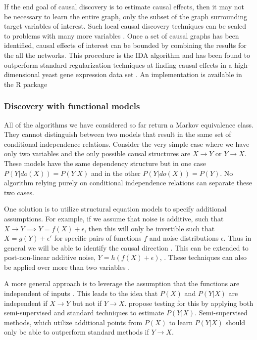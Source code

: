 \documentclass[11pt,a4paper]{article}
\begin{document}
If the end goal of causal discovery is to estimate causal effects, then it may not be necessary to learn the entire graph, only the subset of the graph surrounding target variables of interest. Such local causal discovery techniques can be scaled to problems with many more variables \cite{Aliferis2002}. Once a set of causal graphs has been identified, causal effects of interest can be bounded by combining the results for the all the networks. This procedure is the IDA algorithm \cite{Maathuis2009} and has been found to outperform standard regularization techniques at finding causal effects in a high-dimensional yeast gene expression data set \cite{Maathuis2010}. An implementation is available in the R package \cite{Kalisch2012}

\subsubsection{Discovery with functional models}
All of the algorithms we have considered so far return a Markov equivalence class. They cannot distinguish between two models that result in the same set of conditional independence relations. Consider the very simple case where we have only two variables and the only possible causal structures are $X \rightarrow Y$ or $Y \rightarrow X$. These models have the same dependency structure but in one case $P(Y|do(X)) = P(Y|X)$ and in the other $P(Y|do(X)) = P(Y)$. No algorithm relying purely on conditional independence relations can separate these two cases.

One solution is to utilize structural equation models to specify additional assumptions. For example, if we assume that noise is additive, such that $X \rightarrow Y \implies Y = f(X)+\epsilon$, then this will only be invertible such that $X = g(Y) + \epsilon'$ for specific pairs of functions $f$ and noise distributions $\epsilon$. Thus in general we will be able to identify the causal direction \cite{Hoyer2009}. This can be extended to post-non-linear additive noise, $Y = h(f(X)+ \epsilon)$, \cite{Zhang2008a}. These techniques can also be applied over more than two variables \cite{Peters2014}.

A more general approach is to leverage the assumption that the functions are independent of inputs \cite{Janzing2012a}. This leads to the idea that $P(X)$ and $P(Y|X)$ are independent if $X \rightarrow Y$ but not if $Y \rightarrow X$. \cite{Janzing2012} propose testing for this by applying both semi-supervised and standard techniques to estimate $P(Y|X)$. Semi-supervised methods, which utilize additional points from $P(X)$ to learn $P(Y|X)$ should only be able to outperform standard methods if $Y \rightarrow X$. 
\end{document}

